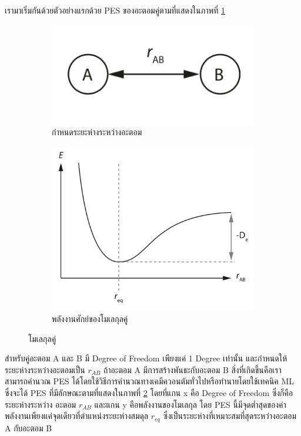เรามาเริ่มกันด้วยตัวอย่างแรกด้วย PES ของอะตอมคู่ตามที่แสดงในภาพที่ \ref{fig:diatomic_mol}

\begin{figure}[H]
    \centering
    \begin{subfigure}{0.5\textwidth}
        \centering
        \includegraphics[width=0.9\linewidth]{fig/diatomic_molecule.png}
        \caption{กำหนดระยะห่างระหว่างอะตอม}
        \label{fig:diatomic_mol}
    \end{subfigure}%
    \begin{subfigure}{0.5\textwidth}
        \centering
        \includegraphics[width=0.9\linewidth]{fig/PES_diatomic_mol.png}
        \caption{พลังงานศักย์ของโมเลกุลคู่}
        \label{fig:PES_diatomic}
    \end{subfigure}
    \caption{โมเลกุลคู่}
    \label{fig:diatomic_mol_and_PES}
\end{figure}

สำหรับคู่อะตอม A และ B มี Degree of Freedom เพียงแค่ 1 Degree เท่านั้น และกำหนดให้ระยะห่างระหว่างอะตอมเป็น $r_{AB}$ ถ้าอะตอม
A มีการสร้างพันธะกับอะตอม B สิ่งที่เกิดขึ้นคือเราสามารถคำนวณ PES ได้โดยใช้วิธีการคำนวณทางเคมีควอนตัมทั่วไปหรือทำนายโดยใช้เทคนิค ML
ซึ่งจะได้ PES ที่มีลักษณะตามที่แสดงในภาพที่ \ref{fig:PES_diatomic} โดยที่แกน x คือ Degree of Freedom ซึ่งก็คือระยะห่างระหว่าง%
อะตอม $r_{AB}$ และแกน y คือพลังงานของโมเลกุล โดย PES นี้มีจุดต่ำสุดของค่าพลังงานเพียงแค่จุดเดียวที่ตำแหน่งระยะห่างสมดุล $r_{eq}$
ซึ่งเป็นระยะห่างที่เหมาะสมที่สุดระหว่างอะตอม A กับอะตอม B

